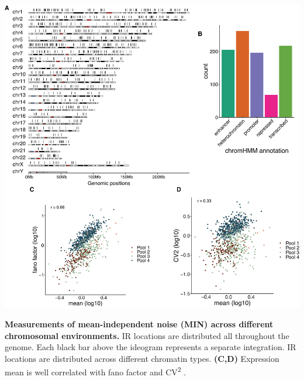 \begin{suppfigure}[p]  
    \centering
    \includegraphics[width=\linewidth]{figures/cas/cas_suppfigure2.png}
    \caption[Measurements of mean-independent noise across different chromosomal environments.]{
        \textbf{Measurements of mean-independent noise (MIN) across different chromosomal environments.}
        IR locations are distributed all throughout the genome. Each black bar above the ideogram represents a separate integration.
        IR locations are distributed across different chromatin types.
        \textbf{(C,D)}
        Expression mean is well correlated with fano factor  and CV\textsuperscript{2} .  
    }
    \label{fig:cas_figureS2}
\end{suppfigure}

